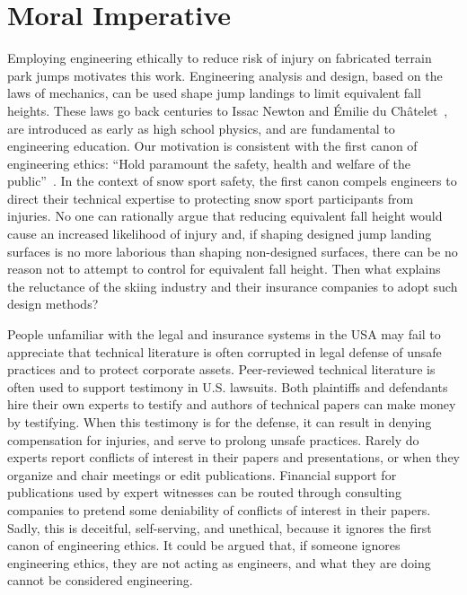 \documentclass{article}
\begin{document}
\section{Moral Imperative}
%
Employing engineering ethically to reduce risk of injury on fabricated terrain
park jumps motivates this work. Engineering analysis and design, based on the
laws of mechanics, can be used shape jump landings to limit equivalent fall
heights. These laws go back centuries to Issac Newton and Émilie du
Châtelet~\cite{Zinsser2007}, are introduced as early as high school physics,
and are fundamental to engineering education. Our motivation is consistent with
the first canon of engineering ethics: ``Hold paramount the safety, health and
welfare of the public''~\cite{NSPE2019}. In the context of snow sport safety,
the first canon compels engineers to direct their technical expertise to
protecting snow sport participants from injuries. No one can rationally argue
that reducing equivalent fall height would cause an increased likelihood of
injury and, if shaping designed jump landing surfaces is no more laborious than
shaping non-designed surfaces, there can be no reason not to attempt to control
for equivalent fall height. Then what explains the reluctance of the skiing
industry and their insurance companies to adopt such design methods?

People unfamiliar with the legal and insurance systems in the USA may fail to
appreciate that technical literature is often corrupted in legal defense of
unsafe practices and to protect corporate assets. Peer-reviewed technical
literature is often used to support testimony in U.S. lawsuits. Both plaintiffs
and defendants hire their own experts to testify and authors of technical
papers can make money by testifying. When this testimony is for the defense, it
can result in denying compensation for injuries, and serve to prolong unsafe
practices. Rarely do experts report conflicts of interest in their papers and
presentations, or when they organize and chair meetings or edit publications.
Financial support for publications used by expert witnesses can be routed
through consulting companies to pretend some deniability of conflicts of
interest in their papers. Sadly, this is deceitful, self-serving, and
unethical, because it ignores the first canon of engineering ethics. It could
be argued that, if someone ignores engineering ethics, they are not acting as
engineers, and what they are doing cannot be considered engineering.
\end{document}
